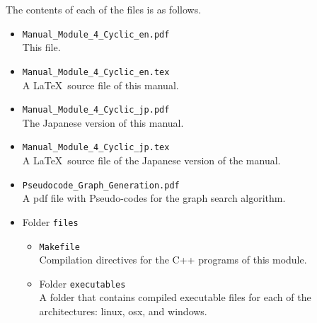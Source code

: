 \documentclass[11pt,titlepage,dvipdfmx,twoside]{article}
\begin{document}
\smallskip
The contents of each of the files is as follows.
%
\begin{itemize}		
 \item {\tt Manual\_Module\_4\_Cyclic\_en.pdf}\\
 This file.
 \item {\tt Manual\_Module\_4\_Cyclic\_en.tex}\\
 A \LaTeX~source file of this manual.
 \item {\tt Manual\_Module\_4\_Cyclic\_jp.pdf}\\
 The Japanese version of this manual.
 \item {\tt Manual\_Module\_4\_Cyclic\_jp.tex}\\
 A \LaTeX~source file of the Japanese version of the manual.
\item{ {\tt Pseudocode\_Graph\_Generation.pdf}}\\
  A pdf file with Pseudo-codes for the graph search algorithm.
 \item Folder {\tt files}
 \begin{itemize}
 \item {\tt Makefile} \\
	    Compilation directives for the C++ programs of this module.
    \item Folder {\tt executables}\\
    A folder that contains compiled executable files for 
    each of the architectures: linux, osx, and windows.
    

\end{itemize}
\end{itemize}
\end{document}
